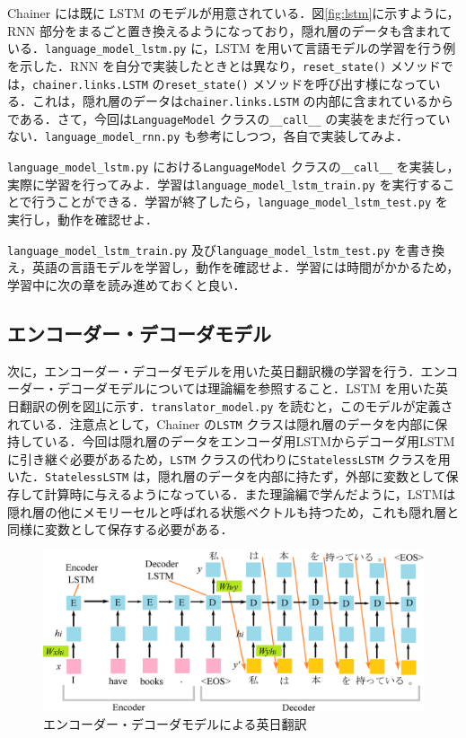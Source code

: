  Chainer には既に LSTM のモデルが用意されている．図\ref{fig:lstm}に示すように，RNN 部分をまるごと置き換えるようになっており，隠れ層のデータも含まれている．\verb+language_model_lstm.py+ に，LSTM を用いて言語モデルの学習を行う例を示した．RNN を自分で実装したときとは異なり，\verb+reset_state()+ メソッドでは，\verb+chainer.links.LSTM+ の\verb+reset_state()+ メソッドを呼び出す様になっている．これは，隠れ層のデータは\verb+chainer.links.LSTM+ の内部に含まれているからである．さて，今回は\verb+LanguageModel+ クラスの\verb+__call__+ の実装をまだ行っていない．\verb+language_model_rnn.py+ も参考にしつつ，各自で実装してみよ．
 \begin{practice}
 \verb+language_model_lstm.py+ における\verb+LanguageModel+ クラスの\verb+__call__+ を実装し，実際に学習を行ってみよ．学習は\verb+language_model_lstm_train.py+ を実行することで行うことができる．学習が終了したら，\verb+language_model_lstm_test.py+ を実行し，動作を確認せよ．
 \end{practice}
 \begin{practice}
  \verb+language_model_lstm_train.py+ 及び\verb+language_model_lstm_test.py+ を書き換え，英語の言語モデルを学習し，動作を確認せよ．学習には時間がかかるため，学習中に次の章を読み進めておくと良い．
 \end{practice}

  \subsection{エンコーダー・デコーダモデル}
 次に，エンコーダー・デコーダモデルを用いた英日翻訳機の学習を行う．エンコーダー・デコーダモデルについては理論編を参照すること．LSTM を用いた英日翻訳の例を図\ref{fig:encdecexample}に示す．\verb+translator_model.py+ を読むと，このモデルが定義されている．注意点として，Chainer の\verb+LSTM+ クラスは隠れ層のデータを内部に保持している．今回は隠れ層のデータをエンコーダ用LSTMからデコーダ用LSTMに引き継ぐ必要があるため，\verb+LSTM+ クラスの代わりに\verb+StatelessLSTM+ クラスを用いた．\verb+StatelessLSTM+ は，隠れ層のデータを内部に持たず，外部に変数として保存して計算時に与えるようになっている．また理論編で学んだように，LSTMは隠れ層の他にメモリーセルと呼ばれる状態ベクトルも持つため，これも隠れ層と同様に変数として保存する必要がある．

  \begin{figure}[htb]
   \centering
   \includegraphics[width=130mm]{images/TsuruokaLab/encdecexample.eps}
   \caption{エンコーダー・デコーダモデルによる英日翻訳}
   \label{fig:encdecexample}
  \end{figure}

